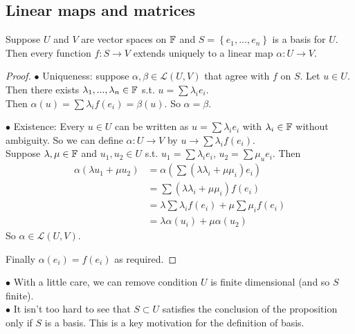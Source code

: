 \documentclass[a4paper]{article}
\begin{document}
\subsection{Linear maps and matrices}
\begin{prop}
Suppose $U$ and $V$ are vector spaces on $\mathbb{F}$ and $S = \left\{e_1,...,e_n\right\}$ is a basis for $U$. Then every function $f: S\to V$ extends uniquely to a linear map $\alpha: U \to V$.
\begin{proof}
$\bullet$ Uniqueness: suppose $\alpha,\beta \in \mathcal{L}\left(U,V\right)$ that agree with $f$ on $S$. Let $u \in U$. Then there exists $\lambda_1,...,\lambda_n \in \mathbb{F}$ s.t. $u = \sum \lambda_i e_i$.\\
Then $\alpha\left(u\right) = \sum \lambda_i f\left(e_i\right) = \beta\left(u\right)$. So $\alpha = \beta$.

$\bullet$ Existence: Every $u \in U$ can be written as $u = \sum \lambda_i e_i$ with $\lambda_i \in \mathbb{F}$ without ambiguity. So we can define $\alpha: U \to V$ by $u \to \sum \lambda_i f\left(e_i\right)$.\\
Suppose $\lambda, \mu \in \mathbb{F}$ and $u_1,u_2 \in U$ s.t. $u_1 = \sum \lambda_i e_i$, $u_2 = \sum \mu_u e_i$. Then
\begin{equation*}
\begin{aligned}
\alpha\left(\lambda u_1 + \mu u_2 \right) &= \alpha \left(\sum\left(\lambda \lambda _i + \mu \mu_i \right) e_i\right)\\
&= \sum\left(\lambda \lambda_i + \mu\mu_i\right) f\left(e_i\right)\\
&= \lambda \sum \lambda_i f\left(e_i\right) + \mu \sum \mu_i f\left(e_i\right)\\
&= \lambda \alpha\left(u_i\right) + \mu \alpha\left(u_2\right) 
\end{aligned}
\end{equation*}
So $\alpha \in \mathcal{L}\left(U,V\right)$.

Finally $\alpha\left(e_i\right) = f\left(e_i\right)$ as required.
\end{proof}
\end{prop}

\begin{rem}
$\bullet$ With a little care, we can remove condition $U$ is finite dimensional (and so $S$ finite).\\
$\bullet$ It isn't too hard to see that $S \subset U$ satisfies the conclusion of the proposition only if $S$ is a basis. This is a key motivation for the definition of basis.
\end{rem}
\end{document}
